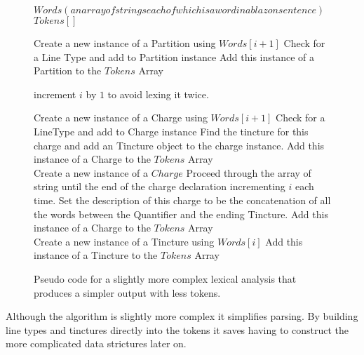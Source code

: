 \begin{figure}[H]
\begin{algorithmic}[1]



\STATE $Words (an array of strings each of which is a word in a blazon sentence) $ 
\STATE $Tokens[]$ \\

		\STATE Create a new instance of a Partition using $Words[i+1]$
		\STATE Check for a Line Type and add to Partition instance
		\STATE Add this instance of a Partition to the $Tokens$ Array

		\STATE increment $i$ by $1$ to avoid lexing it twice. 

		\STATE Create a new instance of a Charge using $Words[i+1]$
		\STATE Check for a LineType and add to Charge instance
		\STATE Find the tincture for this charge and add an Tincture object to the charge instance. 
		\STATE Add this instance of a Charge to the $Tokens$ Array \\

		\STATE Create a new instance of a $Charge$ 
		\STATE Proceed through the array of string until the end of the charge declaration incrementing $i$ each time.  
		\STATE Set the description of this charge to be the concatenation of all the words between the Quantifier and the ending Tincture.
		\STATE Add this instance of a Charge to the $Tokens$ Array \\

		\STATE Create a new instance of a Tincture using $Words[i]$
		\STATE Add this instance of a Tincture to the $Tokens$ Array
 	\ENDIF
\ENDFOR

\end{algorithmic}
\caption{Pseudo code for a slightly more complex lexical analysis that produces a simpler output with less tokens.}
\end{figure}

Although the algorithm is slightly more complex it simplifies parsing.  By building line types and tinctures directly into the tokens it saves having to construct the more complicated data strictures later on. 


